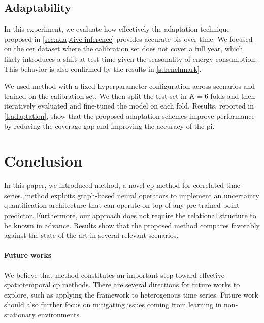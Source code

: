 \subsection{Adaptability}\label{sec:adpatation-exp}

In this experiment, we evaluate how effectively the adaptation technique proposed in \autoref{sec:adaptive-inference} provides accurate \glspl{pi} over time. We focused on the \gls{cer} dataset where the calibration set does not cover a full year, which likely introduces a shift at test time given the seasonality of energy consumption. This behavior is also confirmed by the results in \autoref{s:benchmark}.

We used \gls{method} with a fixed hyperparameter configuration across scenarios and trained on the calibration set.
We then split the test set in $K=6$ folds and then iteratively evaluated and fine-tuned the model on each fold. Results, reported in \autoref{t:adaptation}, show that the proposed adaptation schemes improve performance by reducing the coverage gap and improving the accuracy of the \gls{pi}. 

\section{Conclusion}\label{sec:conclusion}

In this paper, we introduced \acrfull{method}, a novel \gls{cp} method for correlated time series. \gls{method} exploits graph-based neural operators to implement an uncertainty quantification architecture that can operate on top of any pre-trained point predictor. Furthermore, our approach does not require the relational structure to be known in advance.  Results show that the proposed method compares favorably against the state-of-the-art in several relevant scenarios. 

\paragraph{Future works} We believe that \gls{method} constitutes an important step toward effective spatiotemporal \gls{cp} methods. There are several directions for future works to explore, such as applying the framework to heterogenous time series. Future work should also further focus on mitigating issues coming from learning in non-stationary environments. 

